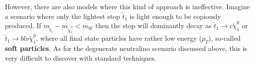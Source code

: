 \documentclass[notes.tex]{subfiles}
\begin{document}
However, there are also models where this kind of approach is ineffective. Imagine a scenario where only the lightest stop $\tilde{t}_1$ is light enough to be copiously produced. If $m_{\tilde{t}_1} - m_{\tilde{\chi}^0_1}< m_W$ then the stop will dominantly decay as $\tilde{t}_1 \to c\tilde{\chi}^0_1$ or $\tilde{t}_1 \to b l \nu \tilde{\chi}^0_1$, where all final state particles have rather low energy ($p_T$), so-called {\bf soft particles}. 
As for the degenerate neutralino scenario discussed above, this is very difficult to discover with standard techniques.

%
\end{document}
